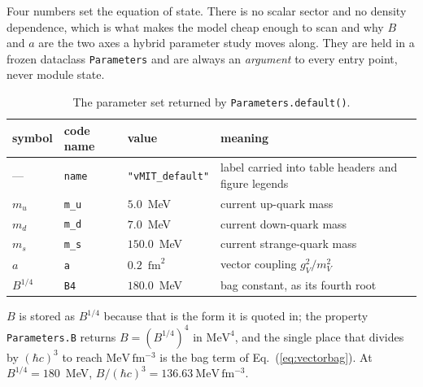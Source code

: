 \documentclass[aps,prc,onecolumn,superscriptaddress,nofootinbib,10pt]{revtex4-2}
\newcommand{\hc}{(\hbar c)^3}
\begin{document}
Four numbers set the equation of state. There is no scalar sector and no
density dependence, which is what makes the model cheap enough to scan and why
$B$ and $a$ are the two axes a hybrid parameter study moves along. They are
held in a frozen dataclass \texttt{Parameters} and are always an
\emph{argument} to every entry point, never module state.

\begin{table}[h]
\centering
\begin{tabular}{llll}
\toprule
symbol & code name & value & meaning \\
\midrule
---       & \texttt{name} & \texttt{"vMIT\_default"} & label carried into
                                     table headers and figure legends \\
$m_u$     & \texttt{m\_u} & $5.0$~MeV   & current up-quark mass \\
$m_d$     & \texttt{m\_d} & $7.0$~MeV   & current down-quark mass \\
$m_s$     & \texttt{m\_s} & $150.0$~MeV & current strange-quark mass \\
$a$       & \texttt{a}    & $0.2$~$\mathrm{fm}^2$ & vector coupling
                                                    $g_V^2/m_V^2$ \\
$B^{1/4}$ & \texttt{B4}   & $180.0$~MeV & bag constant, as its fourth root \\
\bottomrule
\end{tabular}
\caption{The parameter set returned by \texttt{Parameters.default()}.}
\label{tab:parameters}
\end{table}

$B$ is stored as $B^{1/4}$ because that is the form it is quoted in; the
property \texttt{Parameters.B} returns $B = (B^{1/4})^4$ in $\mathrm{MeV}^4$,
and the single place that divides by $\hc$ to reach $\mathrm{MeV\,fm^{-3}}$ is
the bag term of Eq.~(\ref{eq:vectorbag}). At $B^{1/4} = 180$~MeV,
$B/\hc = 136.63\ \mathrm{MeV\,fm^{-3}}$.
\end{document}
